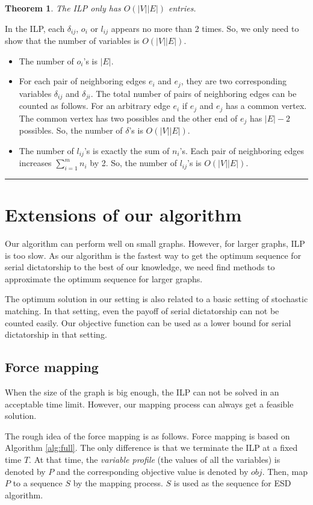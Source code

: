\documentclass[letterpaper]{article}
\newtheorem{theorem}{Theorem}%
\newenvironment{proof}{{Proof:}}{\hfill\rule{2mm}{2mm}}
\begin{document}
\begin{theorem}
	The ILP only has $O(|V||E|)$ entries.
\end{theorem}
\begin{proof}
	In the ILP, each $\delta_{ij}$, $o_i$ or $l_{ij}$  appears no more than 2 times.
	So, we only need to show that the number of variables is $O(|V||E|)$.
	\begin{itemize}
		\item The number of $o_i$'s is $|E|$.
		\item For each pair of neighboring edges $e_i$ and $e_j$, they are two corresponding variables $\delta_{ij}$ and $\delta_{ji}$. The total number of pairs of neighboring edges can be counted as follows. For an arbitrary edge $e_i$ if $e_j$ and $e_j$ has a common vertex. The common vertex has two possibles and the other end of $e_j$ has $|E|-2$ possibles. So, the number of $\delta$'s is $O(|V||E|)$.
		\item The number of $l_{ij}$'s is exactly the sum of $n_i$'s. Each pair of neighboring edges increases $\sum_{i=1}^m n_i$ by 2. So, the number of $l_{ij}$'s is $O(|V||E|)$.
	\end{itemize}
\end{proof}

\section{Extensions of our algorithm}
Our algorithm can perform well on small graphs.
However, for larger graphs, ILP is too slow.
As our algorithm is the fastest way to get the optimum sequence for serial dictatorship to the best of our knowledge, we need find methods to approximate the optimum sequence for larger graphs.

The optimum solution in our setting is also related to a basic setting of stochastic matching. In that setting, even the payoff of serial dictatorship can not be counted easily. Our objective function can be used as a lower bound for serial dictatorship in that setting. 

\subsection{Force mapping}\label{sec:force}
When the size of the graph is big enough, the ILP can not be solved in an acceptable time limit.
However, our mapping process can always get a feasible solution.

The rough idea of the force mapping is as follows.
Force mapping is based on Algorithm \ref{alg:full}.
The only difference is that we terminate the ILP at a fixed time $T$.
At that time, the \textit{variable profile} (the values of all the variables) is denoted by $P$ and the corresponding objective value is denoted by $obj$.
Then, map $P$ to a sequence $S$ by the mapping process.
$S$ is used as the sequence for ESD algorithm.
\end{document}
